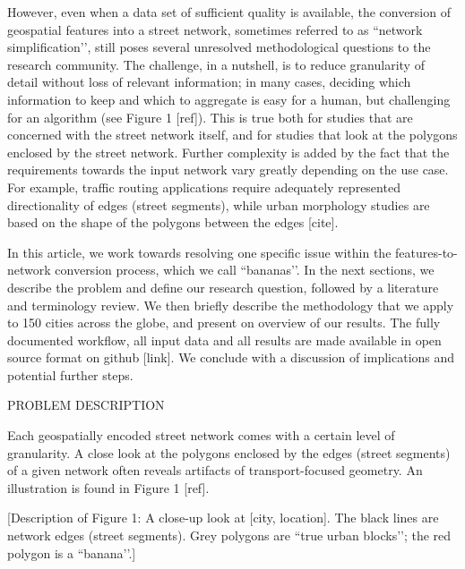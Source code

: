However, even when a data set of sufficient quality is available, the conversion of geospatial features into a street network, sometimes referred to as ``network simplification’’, still poses several unresolved methodological questions to the research community. The challenge, in a nutshell, is to reduce granularity of detail without loss of relevant information; in many cases, deciding which information to keep and which to aggregate is easy for a human, but challenging for an algorithm (see Figure 1 [ref]). This is true both for studies that are concerned with the street network itself, and for studies that look at the polygons enclosed by the street network. Further complexity is added by the fact that the requirements towards the input network vary greatly depending on the use case. For example, traffic routing applications require adequately represented directionality of edges (street segments), while urban morphology studies are based on the shape of the polygons between the edges [cite]. 

In this article, we work towards resolving one specific issue within the features-to-network conversion process, which we call ``bananas’’. In the next sections, we describe the problem and define our research question, followed by a literature and terminology review. We then briefly describe the methodology that we apply to 150 cities across the globe, and present on overview of our results. The fully documented workflow, all input data and all results are made available in open source format on github [link]. We conclude with a discussion of implications and potential further steps.



PROBLEM DESCRIPTION



Each geospatially encoded street network comes with a certain level of granularity. A close look at the polygons enclosed by the edges (street segments) of a given network often reveals artifacts of transport-focused geometry. An illustration is found in Figure 1 [ref]. 


[Description of Figure 1: A close-up look at [city, location]. The black lines are network edges (street segments). Grey polygons are ``true urban blocks’’; the red polygon is a ``banana’’.]


